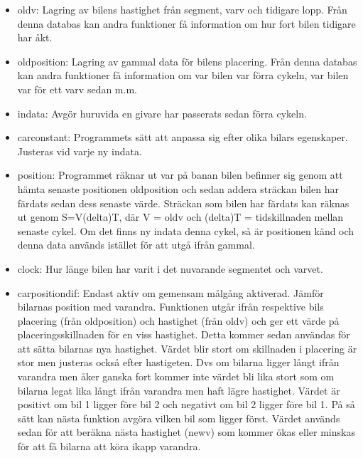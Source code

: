     \begin{itemize}
	
	\item old\textunderscore v: Lagring av bilens hastighet från segment, varv och tidigare lopp. Från denna databas kan andra funktioner få information om hur fort bilen tidigare har åkt. 
	\item old\textunderscore position: Lagring av gammal data för bilens placering. Från denna databas kan andra funktioner få information om var bilen var förra cykeln, var bilen var för ett varv sedan m.m.
      \item indata: Avgör huruvida en givare har passerats sedan förra cykeln.
      \item car\textunderscore constant: Programmets sätt att anpassa sig efter olika bilars egenskaper. Justeras vid varje ny indata.
      \item position: Programmet räknar ut var på banan bilen befinner sig genom att hämta senaste positionen old\textunderscore position och sedan addera sträckan bilen har färdats sedan dess senaste värde. Sträckan som bilen har färdats kan räknas ut genom S=V\textasteriskcentered (delta)T, där V = old\textunderscore v och (delta)T = tidskillnaden mellan senaste cykel. Om det finns ny indata denna cykel, så är positionen känd och denna data används istället för att utgå ifrån gammal.
      \item clock: Hur länge bilen har varit i det nuvarande segmentet och varvet.

      \item car\textunderscore position\textunderscore dif: Endast aktiv om gemensam målgång aktiverad. Jämför bilarnas position med varandra. Funktionen utgår ifrån respektive bils placering (från old\textunderscore position) och hastighet (från old\textunderscore v) 
och ger ett värde på placeringsskillnaden för en viss hastighet. Detta kommer
sedan användas för att sätta bilarnas nya hastighet. Värdet blir stort om skillnaden i placering är stor men justeras också efter hastigeten. Dvs om bilarna ligger långt ifrån varandra men åker ganska fort kommer inte värdet bli lika stort som om bilarna legat lika långt ifrån varandra men haft lägre hastighet. Värdet är positivt om bil 1 ligger före bil 2 och negativt om bil 2 ligger före bil 1. På så sätt kan nästa funktion avgöra vilken bil som ligger först.
Värdet används sedan för att beräkna nästa hastighet (new\textunderscore v) som kommer ökas eller minskas för att få bilarna att köra ikapp varandra. 


\end{itemize}
